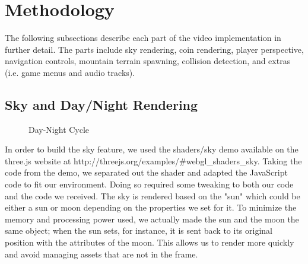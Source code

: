\documentclass{article}
\begin{document}
\section{Methodology}
The following subsections describe each part of the video implementation in further detail.  The parts include sky rendering, coin rendering, player perspective, navigation controls, mountain terrain spawning, collision detection, and extras (i.e. game menus and audio tracks).
\subsection{Sky and Day/Night Rendering}
\begin{figure}[H]
\begin{center}
\caption{Day-Night Cycle}
\end{center}
\end{figure}
In order to build the sky feature, we used the shaders/sky demo available on the three.js website at http://threejs.org/examples/#webgl_shaders_sky. Taking the code from the demo, we separated out the shader and adapted the JavaScript code to fit our environment. Doing so required some tweaking to both our code and the code we received. The sky is rendered based on the "sun" which could be either a sun or moon depending on the properties we set for it. To minimize the memory and processing power used, we actually made the sun and the moon the same object; when the sun sets, for instance, it is sent back to its original position with the attributes of the moon. This allows us to render more quickly and avoid managing assets that are not in the frame.
 
\end{document}
